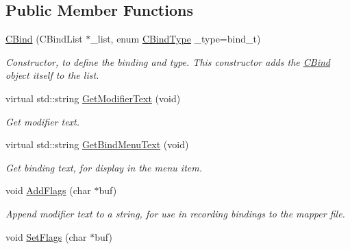 \subsection*{Public Member Functions}
\begin{DoxyCompactItemize}
\item 
\hypertarget{classCBind_a4b69039bdd127345de22a16ef38843e9}{\hyperlink{classCBind_a4b69039bdd127345de22a16ef38843e9}{C\-Bind} (C\-Bind\-List $\ast$\-\_\-list, enum \hyperlink{classCBind_a6bd04329a3b3b8673f7bd4469f92eb61}{C\-Bind\-Type} \-\_\-type=bind\-\_\-t)}\label{classCBind_a4b69039bdd127345de22a16ef38843e9}

\begin{DoxyCompactList}\small\item\em Constructor, to define the binding and type. This constructor adds the \hyperlink{classCBind}{C\-Bind} object itself to the list. \end{DoxyCompactList}\item 
\hypertarget{classCBind_ab383a16224dba3e1963700a8be1f951d}{virtual std\-::string \hyperlink{classCBind_ab383a16224dba3e1963700a8be1f951d}{Get\-Modifier\-Text} (void)}\label{classCBind_ab383a16224dba3e1963700a8be1f951d}

\begin{DoxyCompactList}\small\item\em Get modifier text. \end{DoxyCompactList}\item 
\hypertarget{classCBind_aad93548b92bf6b2bb83eee35b7f15d5d}{virtual std\-::string \hyperlink{classCBind_aad93548b92bf6b2bb83eee35b7f15d5d}{Get\-Bind\-Menu\-Text} (void)}\label{classCBind_aad93548b92bf6b2bb83eee35b7f15d5d}

\begin{DoxyCompactList}\small\item\em Get binding text, for display in the menu item. \end{DoxyCompactList}\item 
\hypertarget{classCBind_aa0773aea4c2324cb3557bf543f8e26de}{void \hyperlink{classCBind_aa0773aea4c2324cb3557bf543f8e26de}{Add\-Flags} (char $\ast$buf)}\label{classCBind_aa0773aea4c2324cb3557bf543f8e26de}

\begin{DoxyCompactList}\small\item\em Append modifier text to a string, for use in recording bindings to the mapper file. \end{DoxyCompactList}\item 
\hypertarget{classCBind_a1ef5657b830e007e1391e3dd2e24bc4e}{void \hyperlink{classCBind_a1ef5657b830e007e1391e3dd2e24bc4e}{Set\-Flags} (char $\ast$buf)}\label{classCBind_a1ef5657b830e007e1391e3dd2e24bc4e}


\end{DoxyCompactItemize}
